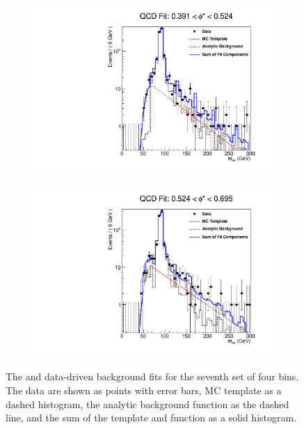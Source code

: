 \begin{figure}[!htbp]
\begin{subfigure}[b]{\SideBySidePlotWidth}
        \includegraphics[width=\linewidth]{figures/qcd_fits/qcd_fit_plot_for_27.pdf}
        \label{fig:qcd_fit_27}
    \end{subfigure}%
    \begin{subfigure}[b]{\SideBySidePlotWidth}
        \includegraphics[width=\linewidth]{figures/qcd_fits/qcd_fit_plot_for_28.pdf}
        \label{fig:qcd_fit_28}
    \end{subfigure}
    \caption[
        The \QCDjets and \wjets data-driven background fits for the seventh set
        of four \phistar bins.
    ]{
        The \QCDjets and \wjets data-driven background fits for the seventh set
        of four \phistar bins. The data are shown as points with error bars, MC
        template as a dashed histogram, the analytic background function as the
        dashed line, and the sum of the template and function as a solid
        histogram.
    }
    \label{fig:qcd_many_7}
\end{figure}

